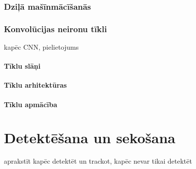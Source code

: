 \documentclass[12pt,paper=a4]{report}
\begin{document}
\subsection{Dziļā mašīnmācīšanās}
\subsection{Konvolūcijas neironu tīkli}
kapēc CNN, pielietojums
\subsubsection{Tīklu slāņi}
\subsubsection{Tīklu arhitektūras}
\subsubsection{Tīklu apmācība}
\chapter{Detektēšana un sekošana}
aprakstīt kapēc detektēt un trackot, kapēc nevar tikai detektēt
\end{document}
